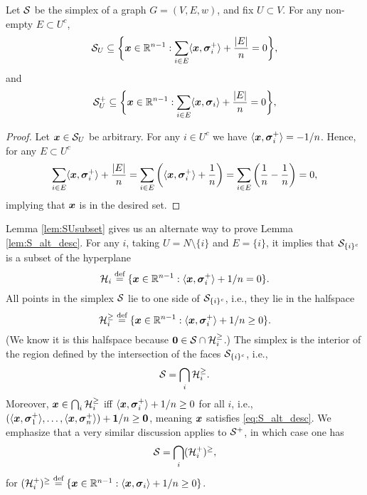 \begin{lemma}
\label{lem:SUsubset}
Let $\mathcal{S}$ be the simplex of a graph $G=(V,E,w)$, and fix $U\subset V$. For any non-empty $E\subset U^c$,
\begin{equation*}
    \mathcal{S}_U \subseteq \bigg\{\vb*{x}\in\mathbb{R}^{n-1}: \sum_{i\in E}\langle \vb*{x},\vb*{\sigma}_i^+\rangle +\frac{|E|}{n}=  0\bigg\},
\end{equation*}
and
\begin{equation*}
    \mathcal{S}^+_U \subseteq \bigg\{\vb*{x}\in\mathbb{R}^{n-1}: \sum_{i\in E}\langle \vb*{x},\vb*{\sigma}_i\rangle +\frac{|E|}{n}=  0\bigg\},
\end{equation*}
\end{lemma}
\begin{proof}
Let $\vb*{x}\in\mathcal{S}_U$ be arbitrary. For any $i\in U^c$ we have $\langle \vb*{x},\vb*{\sigma}_i^+\rangle = -1/n$. Hence, for any $E\subset U^c$
\[\sum_{i\in E}\langle \vb*{x},\vb*{\sigma}_i^+\rangle + \frac{|E|}{n} = \sum_{i\in E}\bigg(\langle \vb*{x},\vb*{\sigma}_i^+\rangle+\frac{1}{n}\bigg)=\sum_{i\in E}\bigg(\frac{1}{n}-\frac{1}{n}\bigg)=0,\]
implying that $\vb*{x}$ is in the desired set. 
\end{proof}

Lemma \ref{lem:SUsubset} gives us an alternate way to prove Lemma \ref{lem:S_alt_desc}. For any $i$,  taking $U=N\setminus \{i\}$ and $E=\{i\}$, it implies that $\mathcal{S}_{\{i\}^c}$ is a subset of the hyperplane 
\[ \mathcal{H}_i\overset{\text{def}}{=} \{\vb*{x}\in\mathbb{R}^{n-1}:\langle \vb*{x},\vb*{\sigma}_i^+\rangle+1/n=0\}.\]
All points in the simplex $\mathcal{S}$ lie to one side of $\mathcal{S}_{\{i\}^c}$, i.e., they lie in the halfspace 
\[\mathcal{H}_i^{\geq } \overset{\text{def}}{=} \{\vb*{x}\in\mathbb{R}^{n-1}:\langle \vb*{x},\vb*{\sigma}_i^+\rangle+1/n\geq0\}.\]
(We know it is this halfspace because $\vb{0}\in\mathcal{S}\cap\mathcal{H}_i^{\geq }$.) The simplex is the interior of the region defined by the intersection of the faces $\mathcal{S}_{\{i\}^c}$, i.e.,   
\begin{equation}
\label{eq:splx_bigcapH_i}
    \mathcal{S}=\bigcap_i \mathcal{H}_i^{\geq }.
\end{equation}
Moreover, $\vb*{x}\in \bigcap_i\mathcal{H}_i^{\geq }$ iff $\langle \vb*{x},\vb*{\sigma}_i^+\rangle +1/n\geq 0$ for all $i$, i.e., $(\langle \vb*{x},\vb*{\sigma}_1^+\rangle,\dots,\langle \vb*{x},\vb*{\sigma}_n^+\rangle) + \vb{1}/n\geq \vb{0}$, meaning $\vb*{x}$ satisfies \eqref{eq:S_alt_desc}.  We emphasize that a very similar discussion applies to $\mathcal{S}^+$, in which case one has 
\begin{equation}
\label{eq:splx^+_bigcapH_i}
\mathcal{S}=\bigcap_i (\mathcal{H}_i^+)^{\geq },
\end{equation}
for $(\mathcal{H}_i^+)^{\geq } \overset{\text{def}}{=} \{\vb*{x}\in\mathbb{R}^{n-1}:\langle \vb*{x},\vb*{\sigma}_i\rangle + 1/n\geq 0\}$. 






